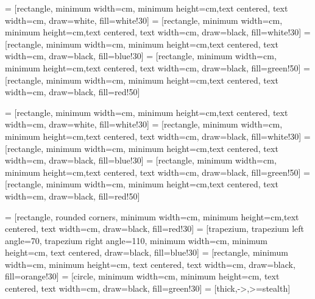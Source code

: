  = [rectangle, minimum width=\tikzwidth cm, minimum height=\tikzheight cm,text centered, text width=\tikzwidth cm, draw=white, fill=white!30]
 = [rectangle, minimum width=\tikzwidth cm, minimum height=\tikzheight cm,text centered, text width=\tikzwidth cm, draw=black, fill=white!30]
 = [rectangle, minimum width=\tikzwidth cm, minimum height=\tikzheight cm,text centered, text width=\tikzwidth cm, draw=black, fill=blue!30]
 = [rectangle, minimum width=\tikzwidth cm, minimum height=\tikzheight cm,text centered, text width=\tikzwidth cm, draw=black, fill=green!50]
 = [rectangle, minimum width=\tikzwidth cm, minimum height=\tikzheight cm,text centered, text width=\tikzwidth cm, draw=black, fill=red!50]

 = [rectangle, minimum width=\tikzwidthwide cm, minimum height=\tikzheight cm,text centered, text width=\tikzwidth cm, draw=white, fill=white!30]
 = [rectangle, minimum width=\tikzwidthwide cm, minimum height=\tikzheight cm,text centered, text width=\tikzwidth cm, draw=black, fill=white!30]
 = [rectangle, minimum width=\tikzwidthwide cm, minimum height=\tikzheight cm,text centered, text width=\tikzwidth cm, draw=black, fill=blue!30]
 = [rectangle, minimum width=\tikzwidthwide cm, minimum height=\tikzheight cm,text centered, text width=\tikzwidth cm, draw=black, fill=green!50]
 = [rectangle, minimum width=\tikzwidthwide cm, minimum height=\tikzheight cm,text centered, text width=\tikzwidth cm, draw=black, fill=red!50]

 = [rectangle, rounded corners, minimum width=\tikzwidth cm, minimum height=\tikzheight cm,text centered, text width=\tikzwidth cm, draw=black, fill=red!30]
 = [trapezium, trapezium left angle=70, trapezium right angle=110, minimum width=\tikzwidth cm, minimum height=\tikzheight cm, text centered, draw=black, fill=blue!30]
 = [rectangle, minimum width=\tikzwidth cm, minimum height=\tikzheight cm, text centered, text width=\tikzwidth cm, draw=black, fill=orange!30]
 = [circle, minimum width=\tikzdec cm, minimum height=\tikzdec cm, text centered, text width=\tikzdec cm, draw=black, fill=green!30]
 = [thick,->,>=stealth]

